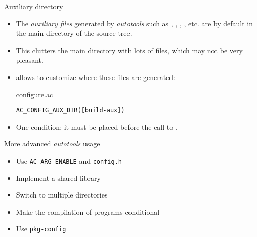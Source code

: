 \begin{frame}[fragile]{Auxiliary directory}

  \begin{itemize}

  \item The {\em auxiliary files} generated by {\em autotools} such as
    , , ,
    , etc. are by default in the main directory of the
    source tree.

  \item This clutters the main directory with lots of files, which may
    not be very pleasant.

  \item {} allows to customize where these files
    are generated:
    \begin{block}{configure.ac}
      \begin{verbatim}
AC_CONFIG_AUX_DIR([build-aux])
\end{verbatim}
\end{block}

\item One condition: it must be placed before the call to
  .

  \end{itemize}

\end{frame}

\setuplabframe
{More advanced {\em autotools} usage}
{
  \begin{itemize}
  \item Use {\tt AC\_ARG\_ENABLE} and {\tt config.h}
  \item Implement a shared library
  \item Switch to multiple directories
  \item Make the compilation of programs conditional
  \item Use {\tt pkg-config}
  \end{itemize}
}
